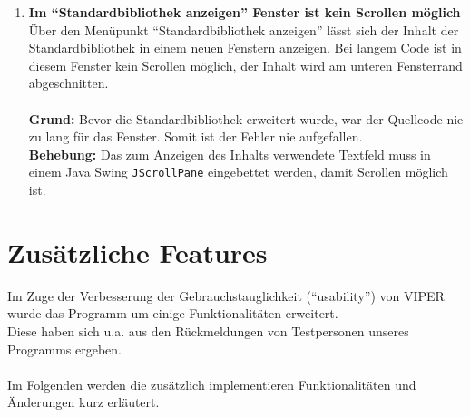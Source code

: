 \documentclass[parskip=full,11pt,twoside]{scrartcl}
\begin{document}
\begin{enumerate}[label=\#\arabic*]
  \item \textbf{Im \enquote{Standardbibliothek anzeigen} Fenster ist kein Scrollen möglich}\\
        Über den Menüpunkt \enquote{Standardbibliothek anzeigen} lässt sich der Inhalt der Standardbibliothek in einem neuen Fenstern anzeigen. Bei langem Code ist in diesem Fenster kein Scrollen möglich, der Inhalt wird am unteren Fensterrand abgeschnitten.\\\\
        \textbf{Grund:} Bevor die Standardbibliothek erweitert wurde, war der Quellcode nie zu lang für das Fenster. Somit ist der Fehler nie aufgefallen.\\
        \textbf{Behebung:} Das zum Anzeigen des Inhalts verwendete Textfeld muss in einem Java Swing \texttt{JScrollPane} eingebettet werden, damit Scrollen möglich ist.
\end{enumerate}

\section{Zusätzliche Features}

Im Zuge der Verbesserung der Gebrauchstauglichkeit (\enquote{usability}) von VIPER wurde das Programm um einige Funktionalitäten erweitert.\\
Diese haben sich u.a. aus den Rückmeldungen von Testpersonen unseres Programms ergeben.\\\\
Im Folgenden werden die zusätzlich implementieren Funktionalitäten und Änderungen kurz erläutert.
\end{document}
